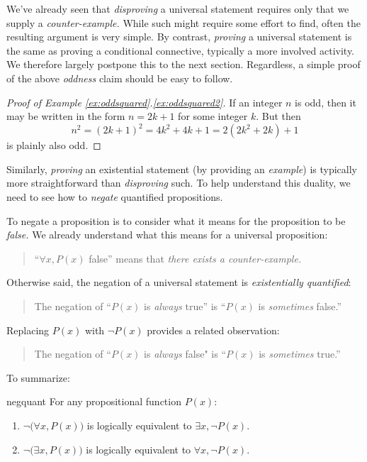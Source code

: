We've already seen that \emph{disproving} a universal statement requires only that we supply a \emph{counter-example.} While such might require some effort to find, often the resulting argument is very simple. By contrast, \emph{proving} a universal statement is the same as proving a conditional connective, typically a more involved activity. We therefore largely postpone this to the next section. Regardless, a simple proof of the above \emph{oddness} claim should be easy to follow.

\begin{proof}[Proof of Example \ref*{ex:oddsquared}.\ref{ex:oddsquared2}]
	If an integer $n$ is odd, then it may be written in the form $n=2k+1$ for some integer $k$. But then
	\[
		n^2 =(2k+1)^2 =4k^2+4k+1 =2(2k^2+2k)+1
	\]
	is plainly also odd.
\end{proof}

Similarly, \emph{proving} an existential statement (by providing an \emph{example}) is typically more straightforward than \emph{disproving} such. To help understand this duality, we need to see how to \emph{negate} quantified propositions.


\goodbreak



To negate a proposition is to consider what it means for the proposition to be \emph{false.} We already understand what this means for a universal proposition:
\begin{quote}
	``$\forall x,P(x)$ false'' means that \emph{there exists a counter-example.}
\end{quote}
Otherwise said, the negation of a universal statement is \emph{existentially quantified}:
\begin{quote}
	The negation of ``$P(x)$ is \emph{always} true'' is ``$P(x)$ is \emph{sometimes} false.''
\end{quote}
Replacing $P(x)$ with $\neg P(x)$ provides a related observation:
\begin{quote}
	The negation of ``$P(x)$ is \emph{always} false" is ``$P(x)$ is \emph{sometimes} true.''
\end{quote}
To summarize:

\begin{thm}{}{negquant}
	For any propositional function $P(x)$:
	\begin{enumerate}
	  \item $\neg\bigl(\forall x, P(x)\bigr)$ is logically equivalent to $\exists x, \neg P(x)$.
	  \item $\neg\bigl(\exists x, P(x)\bigr)$ is logically equivalent to $\forall x, \neg P(x)$.
	\end{enumerate}
\end{thm}


